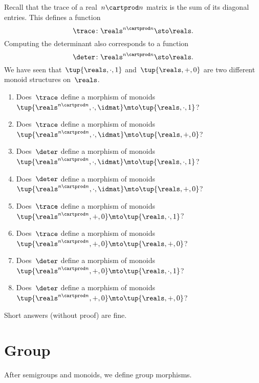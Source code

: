 \begin{gradedexercise}
    Recall that the trace of a real~$n \cartprod n$ matrix is the sum of its diagonal entries.
    This defines a function
    \begin{equation*}
        \trace \colon \reals^{n \cartprod n} \sto \reals.
    \end{equation*}
    Computing the determinant also corresponds to a function
    \begin{equation*}
        \deter \colon \reals^{n \cartprod n} \sto \reals.
    \end{equation*}
    We have seen that~$\tup{ \reals, \cdot, 1}$ and~$\tup{ \reals, +, 0}$ are two different monoid structures on~$\reals$.
    \begin{enumerate}
        \item Does~$\trace$ define a morphism of monoids~$\tup{\reals^{n \cartprod n}, \cdot, \idmat} \mto \tup{ \reals, \cdot, 1}$?
        \item Does~$\trace$ define a morphism of monoids~$\tup{\reals^{n \cartprod n}, \cdot, \idmat} \mto \tup{ \reals, + , 0}$?
        \item Does~$\deter$ define a morphism of monoids~$\tup{\reals^{n \cartprod n}, \cdot, \idmat} \mto \tup{ \reals, \cdot, 1}$?
        \item Does~$\deter$ define a morphism of monoids~$\tup{\reals^{n \cartprod n}, \cdot, \idmat} \mto \tup{ \reals, + , 0}$?
        \item Does~$\trace$ define a morphism of monoids~$\tup{\reals^{n \cartprod n}, +, 0} \mto \tup{ \reals, \cdot, 1}$?
        \item Does~$\trace$ define a morphism of monoids~$\tup{\reals^{n \cartprod n}, +, 0} \mto \tup{ \reals, + , 0}$?
        \item Does~$\deter$ define a morphism of monoids~$\tup{\reals^{n \cartprod n}, +, 0} \mto \tup{ \reals, \cdot, 1}$?
        \item Does~$\deter$ define a morphism of monoids~$\tup{\reals^{n \cartprod n}, +, 0} \mto \tup{ \reals, + , 0}$?
    \end{enumerate}
    Short answers (without proof) are fine.
\end{gradedexercise}

\section{Group \whomos}

After semigroups and monoids, we define group morphisms.


